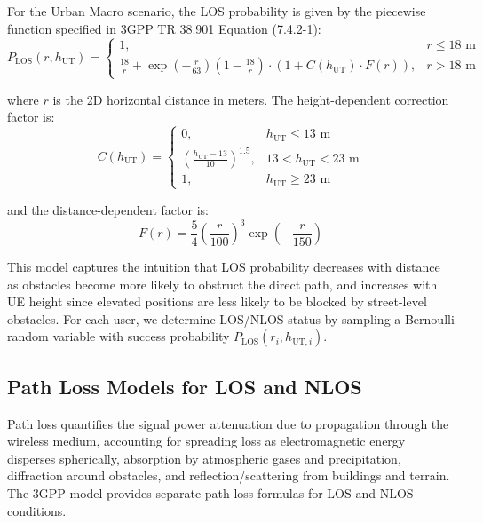 For the Urban Macro scenario, the LOS probability is given by the piecewise function specified in 3GPP TR 38.901 Equation (7.4.2-1):
\begin{equation}
P_{\text{LOS}}(r, h_{\text{UT}}) = \begin{cases}
1, & r \leq 18 \text{ m} \\
\frac{18}{r} + \exp\left(-\frac{r}{63}\right)\left(1 - \frac{18}{r}\right) \cdot \left(1 + C(h_{\text{UT}}) \cdot F(r)\right), & r > 18 \text{ m}
\end{cases}
\end{equation}

where $r$ is the 2D horizontal distance in meters. The height-dependent correction factor is:
\begin{equation}
C(h_{\text{UT}}) = \begin{cases}
0, & h_{\text{UT}} \leq 13 \text{ m} \\
\left(\frac{h_{\text{UT}} - 13}{10}\right)^{1.5}, & 13 < h_{\text{UT}} < 23 \text{ m} \\
1, & h_{\text{UT}} \geq 23 \text{ m}
\end{cases}
\end{equation}

and the distance-dependent factor is:
\begin{equation}
F(r) = \frac{5}{4}\left(\frac{r}{100}\right)^3 \exp\left(-\frac{r}{150}\right)
\end{equation}

This model captures the intuition that LOS probability decreases with distance as obstacles become more likely to obstruct the direct path, and increases with UE height since elevated positions are less likely to be blocked by street-level obstacles. For each user, we determine LOS/NLOS status by sampling a Bernoulli random variable with success probability $P_{\text{LOS}}(r_i, h_{\text{UT},i})$.

\subsection{Path Loss Models for LOS and NLOS}

Path loss quantifies the signal power attenuation due to propagation through the wireless medium, accounting for spreading loss as electromagnetic energy disperses spherically, absorption by atmospheric gases and precipitation, diffraction around obstacles, and reflection/scattering from buildings and terrain. The 3GPP model provides separate path loss formulas for LOS and NLOS conditions.

